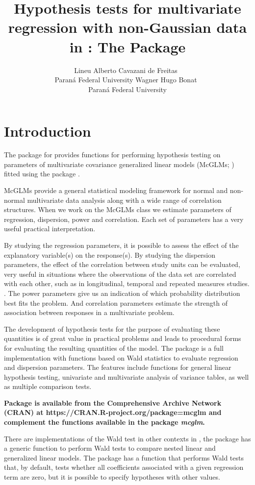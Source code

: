 \documentclass[article]{jss}\usepackage[]{graphicx}\usepackage[]{xcolor}
\author{Lineu Alberto Cavazani de Freitas~\orcidlink{0000-0002-0076-6642}\\Paraná Federal University
   \And Wagner Hugo Bonat~\orcidlink{0000-0002-0349-7054}\\Paraná Federal University}
\title{Hypothesis tests for multivariate regression with non-Gaussian data in \proglang{R}: The \pkg{htmcglm} Package}
\begin{document}

\section{Introduction} \label{sec:intro}

The  package for  \citep{R2022} provides functions for performing hypothesis testing on parameters of multivariate covariance generalized linear models (McGLMs; \citet{Bonat16}) fitted using the  package \citep{mcglm}. 

McGLMs provide a general statistical modeling framework for normal and non-normal multivariate data analysis along with a wide range of correlation structures. When we work on the McGLMs class we estimate parameters of regression, dispersion, power and correlation. Each set of parameters has a very useful practical interpretation.

By studying the regression parameters, it is possible to assess the effect of the explanatory variable(s) on the response(s). By studying the dispersion parameters, the effect of the correlation between study units can be evaluated, very useful in situations where the observations of the data set are correlated with each other, such as in longitudinal, temporal and repeated measures studies. . The power parameters give us an indication of which probability distribution best fits the problem. And correlation parameters estimate the strength of association between responses in a multivariate problem.

The development of hypothesis tests for the purpose of evaluating these quantities is of great value in practical problems and leads to procedural forms for evaluating the resulting quantities of the model. The  package is a full  implementation with functions based on Wald statistics to evaluate regression and dispersion parameters. The features include functions for general linear hypothesis testing, univariate and multivariate analysis of variance tables, as well as multiple comparison tests.

\textbf{Package  is available from the Comprehensive  Archive Network (CRAN) at https://CRAN.R-project.org/package=mcglm and complement the functions available in the package \emph{mcglm}.}

There are implementations of the Wald test in other contexts in , the package  \citep{lmtest} has a generic function to perform Wald tests to compare nested linear and generalized linear models. The package  \citep{survey1,survey2,survey3} has a function that performs Wald tests that, by default, tests whether all coefficients associated with a given regression term are zero, but it is possible to specify hypotheses with other values.
\end{document}
